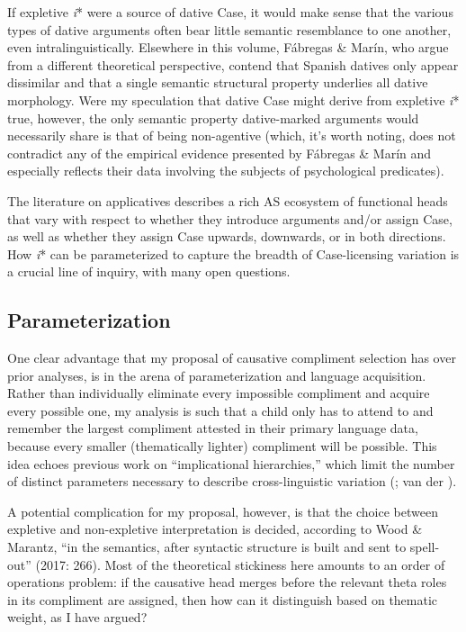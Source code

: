 \documentclass[output=paper,modfonts,nonflat,colorlinks,citecolor=brown]{langsci/langscibook}
\begin{document}
If expletive \textit{i}* were a source of dative Case, it would make sense that the various types of dative arguments often bear little semantic resemblance to one another, even intralinguistically. Elsewhere in this volume, Fábregas \& Marín, who argue from a different theoretical perspective, contend that Spanish datives only appear dissimilar and that a single semantic structural property underlies all dative morphology. Were my speculation that dative Case might derive from expletive \textit{i}* true, however, the only semantic property dative-marked arguments would necessarily share is that of being non-agentive (which, it’s worth noting, does not contradict any of the empirical evidence presented by Fábregas \& Marín and especially reflects their data involving the subjects of psychological predicates). 



The literature on applicatives describes a rich AS ecosystem of functional heads that vary with respect to whether they introduce arguments and/or assign Case, as well as whether they assign Case upwards, downwards, or in both directions. How \textit{i}* can be parameterized to capture the breadth of Case-licensing variation is a crucial line of inquiry, with many open questions.

\subsection{Parameterization}\label{sec:wechsler:4.3}

One clear advantage that my proposal of causative compliment selection has over prior analyses, is in the arena of parameterization and language acquisition. Rather than individually eliminate every impossible compliment and acquire every possible one, my analysis is such that a child only has to attend to and remember the largest compliment attested in their primary language data, because every smaller (thematically lighter) compliment will be possible. This idea echoes previous work on “implicational hierarchies,” which limit the number of distinct parameters necessary to describe cross-linguistic variation (\citealt{HolmbergRoberts2009,Biberauer2011,BiberauerRoberts2012significance,BiberauerRoberts2015,Sheehan2013,BiberauerEtAl2013}; van der \citealt{WalBiberauer2014,BiberauerEtAl2014,vanderWal2017}).

A potential complication for my proposal, however, is that the choice between expletive and non-expletive interpretation is decided, according to Wood \& Marantz, “in the semantics, after syntactic structure is built and sent to spell-out” (2017: 266). Most of the theoretical stickiness here amounts to an order of operations problem: if the causative head merges before the relevant theta roles in its compliment are assigned, then how can it distinguish based on thematic weight, as I have argued? 
\end{document}

